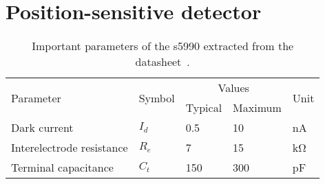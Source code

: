 \section{Position-sensitive detector}


\cite{Noorlag74} %


\begin{table}[H]
	\centering
	\begin{tabular}{lllll}
		\toprule
			\multirow{2}[3]{*}{Parameter} &
			\multirow{2}[3]{*}{Symbol} &
			\multicolumn{2}{c}{Values} &
			\multirow{2}[3]{*}{Unit} \\
			\cmidrule(lr){3-4} & & Typical & Maximum & \\
		\midrule
		Dark current & $I_d$ & \num{0.5} & \num{10} & \si{\nano\ampere}\\
		Interelectrode resistance & $R_e$ & \num{7} & \num{15} & \si{\kilo\ohm}\\
		Terminal capacitance & $C_t$ & \num{150} & \num{300} & \si{\pico\farad}\\
		\bottomrule	
	\end{tabular}
	\caption{Important parameters of the \gls{s5990} extracted from the datasheet~\cite{HamamatsuS5990}.}\label{tab:psd_s5990}
\end{table}
